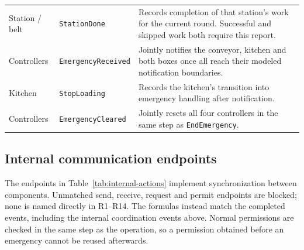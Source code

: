 \documentclass[11pt,a4paper]{article}
\begin{document}
\begin{longtable}{@{}>{\raggedright\arraybackslash}p{}>{\raggedright\arraybackslash}p{}>{\raggedright\arraybackslash}p{}@{}}
Station / belt & \texttt{StationDone} & Records completion of that station's work for the current round. Successful and skipped work both require this report. \\
Controllers & \texttt{EmergencyReceived} & Jointly notifies the conveyor, kitchen and both boxes once all reach their modeled notification boundaries. \\
Kitchen & \texttt{StopLoading} & Records the kitchen's transition into emergency handling after notification. \\
Controllers & \texttt{EmergencyCleared} & Jointly resets all four controllers in the same step as \texttt{EndEmergency}. \\
\end{longtable}
\endgroup

\subsection{Internal communication endpoints}

The endpoints in Table~\ref{tab:internal-actions} implement synchronization between components. Unmatched send, receive, request and permit endpoints are blocked; none is named directly in R1--R14. The formulas instead match the completed events, including the internal coordination events above. Normal permissions are checked in the same step as the operation, so a permission obtained before an emergency cannot be reused afterwards.
\end{document}
